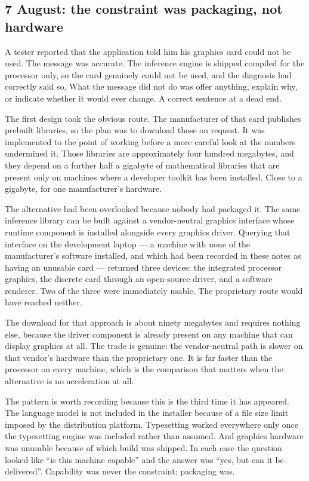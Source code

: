 \documentclass[11pt,a4paper]{article}
\begin{document}
\subsection{7 August: the constraint was packaging, not hardware}

A tester reported that the application told him his graphics card could not be
used. The message was accurate. The inference engine is shipped compiled for the
processor only, so the card genuinely could not be used, and the diagnosis had
correctly said so. What the message did not do was offer anything, explain why,
or indicate whether it would ever change. A correct sentence at a dead end.

The first design took the obvious route. The manufacturer of that card publishes
prebuilt libraries, so the plan was to download those on request. It was
implemented to the point of working before a more careful look at the numbers
undermined it. Those libraries are approximately four hundred megabytes, and
they depend on a further half a gigabyte of mathematical libraries that are
present only on machines where a developer toolkit has been installed. Close to
a gigabyte, for one manufacturer's hardware.

The alternative had been overlooked because nobody had packaged it. The same
inference library can be built against a vendor-neutral graphics interface whose
runtime component is installed alongside every graphics driver. Querying that
interface on the development laptop --- a machine with none of the manufacturer's
software installed, and which had been recorded in these notes as having an
unusable card --- returned three devices: the integrated processor graphics, the
discrete card through an open-source driver, and a software renderer. Two of the
three were immediately usable. The proprietary route would have reached neither.

The download for that approach is about ninety megabytes and requires nothing
else, because the driver component is already present on any machine that can
display graphics at all. The trade is genuine: the vendor-neutral path is slower
on that vendor's hardware than the proprietary one. It is far faster than the
processor on every machine, which is the comparison that matters when the
alternative is no acceleration at all.

The pattern is worth recording because this is the third time it has appeared.
The language model is not included in the installer because of a file size limit
imposed by the distribution platform. Typesetting worked everywhere only once
the typesetting engine was included rather than assumed. And graphics hardware
was unusable because of which build was shipped. In each case the question
looked like ``is this machine capable'' and the answer was ``yes, but can it be
delivered''. Capability was never the constraint; packaging was.
\end{document}
